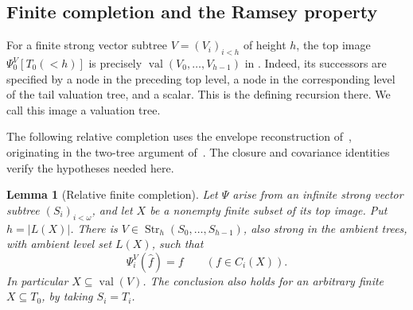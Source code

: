 \documentclass{article}
\numberwithin{equation}{section}
\newtheorem{lemma}[theorem]{Lemma}
\theoremstyle{definition}
\DeclareMathOperator{\val}{val}
\DeclareMathOperator{\Str}{Str}
\begin{document}
\subsection{Finite completion and the Ramsey property}

For a finite strong vector subtree $V=(V_i)_{i<h}$ of height $h$, the top
image $\Psi_0^V[T_0(<h)]$ is precisely $\val(V_0,\ldots,V_{h-1})$ in
\cite[Definition~3.3]{InfiniteLanguages}. Indeed, its successors are specified
by a node in the preceding top level, a node in the corresponding level of
the tail valuation tree, and a scalar. This is the defining recursion there.
We call this image a valuation tree.

The following relative completion uses the envelope reconstruction
of~\cite[Lemma~4.4]{InfiniteLanguages}, originating in the two-tree
argument of~\cite[Lemma~3.3]{TernaryFinite}. The closure and covariance
identities verify the hypotheses needed here.

\begin{lemma}[Relative finite completion]\label{lem:completion}
Let $\Psi$ arise from an infinite strong vector subtree $(S_i)_{i<\omega}$,
and let $X$ be a nonempty finite subset of its top image. Put $h=|L(X)|$.
There is $V\in\Str_h(S_0,\ldots,S_{h-1})$, also strong in the ambient
trees, with ambient level set $L(X)$, such that
\begin{equation}\label{eq:reconstruction}
\Psi_i^V(\widehat f)=f\qquad(f\in C_i(X)).
\end{equation}
In particular $X\subseteq\val(V)$. The conclusion also holds for an arbitrary
finite $X\subseteq T_0$, by taking $S_i=T_i$.
\end{lemma}
\end{document}
